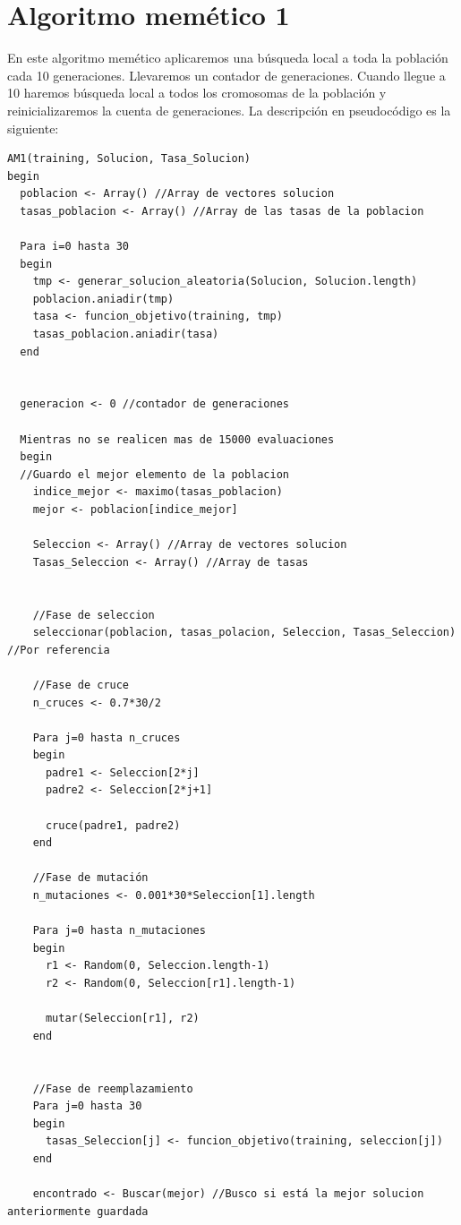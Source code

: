 \section{Algoritmo memético 1}
En este algoritmo memético aplicaremos una búsqueda local a toda la población cada 10 generaciones. Llevaremos un contador de generaciones. Cuando llegue a 10 haremos búsqueda local a todos los cromosomas de la población y reinicializaremos la cuenta de generaciones. La descripción en pseudocódigo es la siguiente:
\begin{lstlisting}
AM1(training, Solucion, Tasa_Solucion)
begin
  poblacion <- Array() //Array de vectores solucion
  tasas_poblacion <- Array() //Array de las tasas de la poblacion

  Para i=0 hasta 30
  begin
    tmp <- generar_solucion_aleatoria(Solucion, Solucion.length)
    poblacion.aniadir(tmp)
    tasa <- funcion_objetivo(training, tmp)
    tasas_poblacion.aniadir(tasa)
  end

  
  generacion <- 0 //contador de generaciones

  Mientras no se realicen mas de 15000 evaluaciones
  begin
  //Guardo el mejor elemento de la poblacion
    indice_mejor <- maximo(tasas_poblacion)
    mejor <- poblacion[indice_mejor]

    Seleccion <- Array() //Array de vectores solucion
    Tasas_Seleccion <- Array() //Array de tasas


    //Fase de seleccion
    seleccionar(poblacion, tasas_polacion, Seleccion, Tasas_Seleccion) //Por referencia

    //Fase de cruce
    n_cruces <- 0.7*30/2

    Para j=0 hasta n_cruces
    begin
      padre1 <- Seleccion[2*j]
      padre2 <- Seleccion[2*j+1]

      cruce(padre1, padre2)
    end

    //Fase de mutación
    n_mutaciones <- 0.001*30*Seleccion[1].length

    Para j=0 hasta n_mutaciones
    begin
      r1 <- Random(0, Seleccion.length-1)
      r2 <- Random(0, Seleccion[r1].length-1)

      mutar(Seleccion[r1], r2)
    end


    //Fase de reemplazamiento
    Para j=0 hasta 30
    begin
      tasas_Seleccion[j] <- funcion_objetivo(training, seleccion[j])
    end

    encontrado <- Buscar(mejor) //Busco si está la mejor solucion anteriormente guardada


\end{lstlisting}
